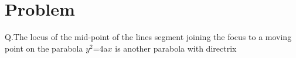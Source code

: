  \lstset{
frame=single, 
breaklines=true,
columns=fullflexible
}
\title{\mytitle}
\author{\myauthor\hspace{1em}\\\contact\\IITH\hspace{0.5em}-\hspace{0.5em}\mymodule}
\date{}
\hypersetup{pdfauthor=\myauthor,pdftitle=\mytitle,pdfkeywords=\mykeywords}
\sloppy

 \maketitle
 \tableofcontents
 
 \Large\section{Problem}
 Q.The locus of the mid-point of the lines segment joining the focus to a moving point on the parabola $y^2$=4a$x$ is another parabola with directrix
 
